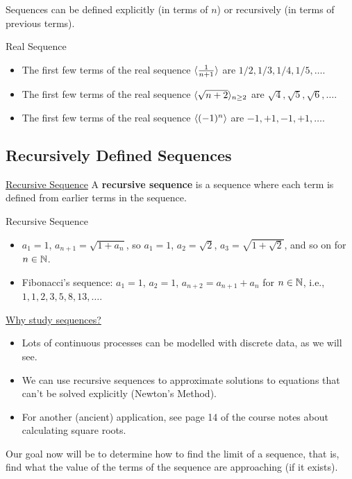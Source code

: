 Sequences can be defined explicitly (in terms of $ n $) or recursively (in terms of previous terms).
\begin{Example}{Real Sequence}{}
    \begin{itemize}
        \item The first few terms of the real sequence $ \langle\frac{1}{n+1}\rangle $ are $ 1/2,1/3,1/4,1/5,\ldots $.
        \item The first few terms of the real sequence $ \langle\sqrt{n+2}\rangle_{n\ge 2} $ are $ \sqrt{4},\sqrt{5},\sqrt{6},\ldots $.
        \item The first few terms of the real sequence $ \langle(-1)^n\rangle $ are $ -1,+1,-1,+1,\ldots $.
    \end{itemize}
\end{Example}
\subsection{Recursively Defined Sequences}
\begin{Definition}{\href{https://proofwiki.org/wiki/Definition:Recursive_Sequence\#Definition}{Recursive Sequence}}{}
    A \textbf{recursive sequence} is a sequence where each term is defined from earlier terms in the sequence.
\end{Definition}
\begin{Example}{Recursive Sequence}{}
    \begin{itemize}
        \item $ a_1=1 $, $ a_{n+1}=\sqrt{1+a_n} $, so $ a_1=1 $, $ a_2=\sqrt{2} $, $ a_3=\sqrt{1+\sqrt{2}} $, and so on for $ n\in\mathbb{N} $.
        \item Fibonacci's sequence: $ a_1=1 $, $ a_2=1 $, $ a_{n+2}=a_{n+1}+a_n $ for $ n\in \mathbb{N} $, i.e.,
              $ 1,1,2,3,5,8,13,\ldots $.
    \end{itemize}
\end{Example}
\underline{Why study sequences?}
\begin{itemize}
    \item Lots of continuous processes can be modelled with discrete data, as we will see.
    \item We can use recursive sequences to approximate solutions to equations that can't be solved explicitly (Newton's Method).
    \item For another (ancient) application, see page 14 of the course notes about calculating square roots.
\end{itemize}
Our goal now will be to determine how to find the limit of a sequence, that is, find what the value of the terms of the sequence
are approaching (if it exists).
